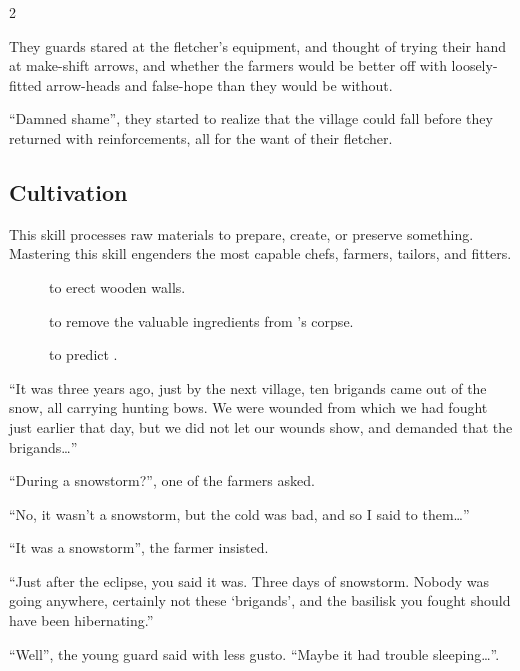 \begin{multicols}{2}
\begin{exampletext}
  They \glspl{guard} stared at the fletcher's equipment, and thought of trying their hand at make-shift arrows, and whether the farmers would be better off with loosely-fitted arrow-heads and false-hope than they would be without.

  ``Damned shame'', they started to realize that the \gls{village} could fall before they returned with reinforcements, all for the want of their fletcher.
\end{exampletext}

\subsection{Cultivation}

This \gls{skill} processes raw materials to prepare, create, or preserve something.
Mastering this \gls{skill} engenders the most capable chefs, farmers, tailors, and fitters.

\begin{description}
  \item[]
    to erect wooden walls.
  \item[]
    to remove the valuable \glspl{ingredient} from 's corpse.
  \item[]
    to predict .
\end{description}

\begin{exampletext}
  ``It was three years ago, just by the next \gls{village}, ten brigands came out of the snow, all carrying hunting bows.
  We were wounded from  which we had fought just earlier that day, but we did not let our wounds show, and demanded that the brigands\ldots''

  ``During a snowstorm?'', one of the farmers asked.

  ``No, it wasn't a snowstorm, but the cold was bad, and so I said to them\ldots''

  ``It was a snowstorm'', the farmer insisted.

  ``Just after the eclipse, you said it was.
  Three days of snowstorm.
  Nobody was going anywhere, certainly not these `brigands', and the \gls{basilisk} you fought should have been hibernating.''

  ``Well'', the young \gls{guard} said with less gusto.
  ``Maybe it had trouble sleeping\ldots''.
\end{exampletext}


\end{multicols}
